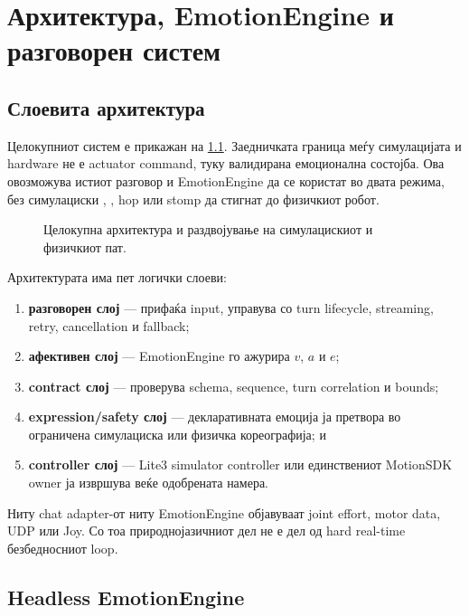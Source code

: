 \chapter{Архитектура, EmotionEngine и разговорен систем}
\label{chap:architecture}

\section{Слоевита архитектура}

Целокупниот систем е прикажан на \cref{fig:system-architecture}. Заедничката
граница меѓу симулацијата и hardware не е actuator command, туку валидирана
емоционална состојба. Ова овозможува истиот разговор и EmotionEngine да се
користат во двата режима, без симулациски , , hop или
stomp да стигнат до физичкиот робот.

\begin{figure}[htbp]
\centering
\resizebox{\textwidth}{!}{}
\caption{Целокупна архитектура и раздвојување на симулацискиот и физичкиот пат.}
\label{fig:system-architecture}
\end{figure}

Архитектурата има пет логички слоеви:

\begin{enumerate}
  \item \textbf{разговорен слој} --- прифаќа input, управува со turn lifecycle,
  streaming, retry, cancellation и fallback;
  \item \textbf{афективен слој} --- EmotionEngine го ажурира $v$, $a$ и $e$;
  \item \textbf{contract слој} --- проверува schema, sequence, turn correlation
  и bounds;
  \item \textbf{expression/safety слој} --- декларативната емоција ја претвора
  во ограничена симулациска или физичка кореографија; и
  \item \textbf{controller слој} --- Lite3 simulator controller или единствениот
  MotionSDK owner ја извршува веќе одобрената намера.
\end{enumerate}

Ниту chat adapter-от ниту EmotionEngine објавуваат joint effort, motor data,
UDP или Joy. Со тоа природнојазичниот дел не е дел од hard real-time
безбедносниот loop.

\section{Headless EmotionEngine}

